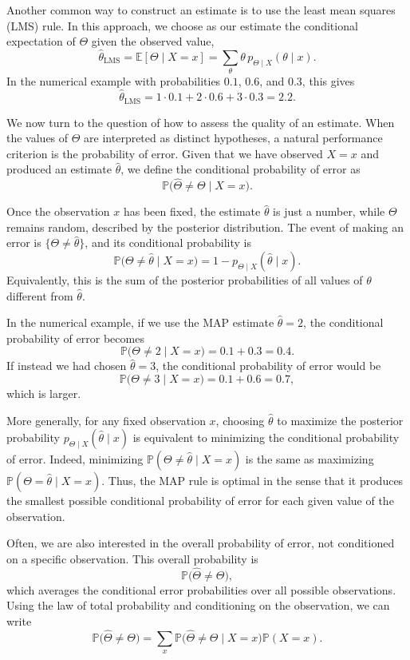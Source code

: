 Another common way to construct an estimate is to use the least mean squares (LMS) rule.  
In this approach, we choose as our estimate the conditional expectation of \(\Theta\) given the observed value,
\[
\hat{\theta}_{\text{LMS}}
=
\mathbb{E}[\Theta \mid X = x]
=
\sum_{\theta} \theta \, p_{\Theta \mid X}(\theta \mid x).
\]
In the numerical example with probabilities \(0.1\), \(0.6\), and \(0.3\), this gives
\[
\hat{\theta}_{\text{LMS}}
=
1 \cdot 0.1 + 2 \cdot 0.6 + 3 \cdot 0.3
=
2.2.
\]

We now turn to the question of how to assess the quality of an estimate.  
When the values of \(\Theta\) are interpreted as distinct hypotheses, a natural performance criterion is the probability of error.  
Given that we have observed \(X = x\) and produced an estimate \(\hat{\theta}\), we define the conditional probability of error as
\[
\mathbb{P}\big(\hat{\Theta} \neq \Theta \mid X = x\big).
\]

Once the observation \(x\) has been fixed, the estimate \(\hat{\theta}\) is just a number, while \(\Theta\) remains random, described by the posterior distribution.  
The event of making an error is \(\{\Theta \neq \hat{\theta}\}\), and its conditional probability is
\[
\mathbb{P}\big(\Theta \neq \hat{\theta} \mid X = x\big)
=
1 - p_{\Theta \mid X}(\hat{\theta} \mid x).
\]
Equivalently, this is the sum of the posterior probabilities of all values of \(\theta\) different from \(\hat{\theta}\).  

In the numerical example, if we use the MAP estimate \(\hat{\theta} = 2\), the conditional probability of error becomes
\[
\mathbb{P}\big(\Theta \neq 2 \mid X = x\big)
=
0.1 + 0.3
=
0.4.
\]
If instead we had chosen \(\hat{\theta} = 3\), the conditional probability of error would be
\[
\mathbb{P}\big(\Theta \neq 3 \mid X = x\big)
=
0.1 + 0.6
=
0.7,
\]
which is larger.  

More generally, for any fixed observation \(x\), choosing \(\hat{\theta}\) to maximize the posterior probability \(p_{\Theta \mid X}(\hat{\theta} \mid x)\) is equivalent to minimizing the conditional probability of error.  
Indeed, minimizing
\(\mathbb{P}(\Theta \neq \hat{\theta} \mid X = x)\) is the same as maximizing \(\mathbb{P}(\Theta = \hat{\theta} \mid X = x)\).  
Thus, the MAP rule is optimal in the sense that it produces the smallest possible conditional probability of error for each given value of the observation.  

Often, we are also interested in the overall probability of error, not conditioned on a specific observation.  
This overall probability is
\[
\mathbb{P}\big(\hat{\Theta} \neq \Theta\big),
\]
which averages the conditional error probabilities over all possible observations.  
Using the law of total probability and conditioning on the observation, we can write
\[
\mathbb{P}\big(\hat{\Theta} \neq \Theta\big)
=
\sum_{x}
\mathbb{P}\big(\hat{\Theta} \neq \Theta \mid X = x\big)
\mathbb{P}(X = x).
\]

